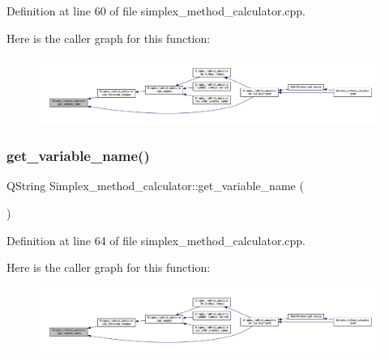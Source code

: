 Definition at line 60 of file simplex\+\_\+method\+\_\+calculator.\+cpp.

Here is the caller graph for this function\+:\nopagebreak
\begin{figure}[H]
\begin{center}
\leavevmode
\includegraphics[width=350pt]{classSimplex__method__calculator_a551cf0e83837a64c4757d8c090d6926f_icgraph}
\end{center}
\end{figure}
\mbox{\label{classSimplex__method__calculator_a192807b33ce7bb45bc724eb0542ffa33}} 
\subsubsection{\texorpdfstring{get\+\_\+variable\+\_\+name()}{get\_variable\_name()}}
{\footnotesize\ttfamily Q\+String Simplex\+\_\+method\+\_\+calculator\+::get\+\_\+variable\+\_\+name (\begin{DoxyParamCaption}{ }\end{DoxyParamCaption})\hspace{0.3cm}{\ttfamily [private]}}



Definition at line 64 of file simplex\+\_\+method\+\_\+calculator.\+cpp.

Here is the caller graph for this function\+:\nopagebreak
\begin{figure}[H]
\begin{center}
\leavevmode
\includegraphics[width=350pt]{classSimplex__method__calculator_a192807b33ce7bb45bc724eb0542ffa33_icgraph}
\end{center}
\end{figure}
\mbox{\label{classSimplex__method__calculator_a4b3ebd66ccdae0e7750932c3d0538a5c}} 
